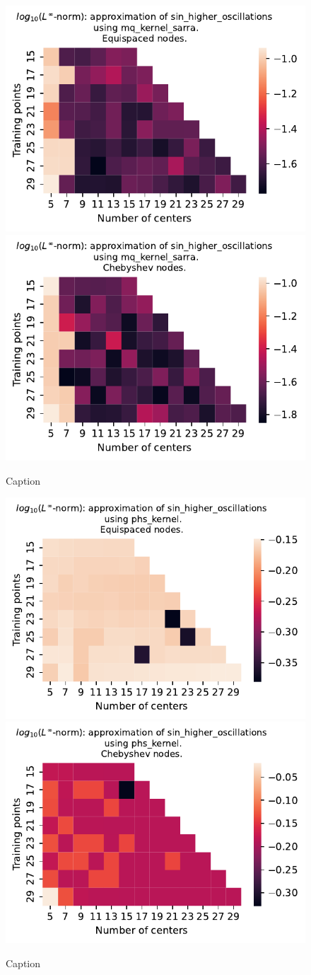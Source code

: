 \documentclass[12pt]{report} %
\begin{document}
\begin{figure}[ht]
  \centering

  \includegraphics[width=.49\textwidth]{imagenes/experiments/1d/variational/sin_higher_oscillations-Kmq_kernel_sarra-Equi.pdf}
  \includegraphics[width=.49\textwidth]{imagenes/experiments/1d/variational/sin_higher_oscillations-Kmq_kernel_sarra-Cheb.pdf}
  \caption{Caption}
  \label{fig:sin-higher-oscillations-sarra}
\end{figure}

\begin{figure}[ht]
  \centering

  \includegraphics[width=.49\textwidth]{imagenes/experiments/1d/variational/sin_higher_oscillations-Kphs_kernel-Equi.pdf}
  \includegraphics[width=.49\textwidth]{imagenes/experiments/1d/variational/sin_higher_oscillations-Kphs_kernel-Cheb.pdf}
  \caption{Caption}
  \label{fig:sin-higher-oscillations-phs}
\end{figure}
\end{document}
